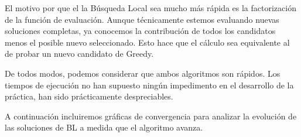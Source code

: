 \documentclass{article}
\begin{document}
   El motivo por que el la Búsqueda Local sea mucho más rápida es la factorización de la función de evaluación. Aunque técnicamente
   estemos evaluando nuevas soluciones completas, ya conocemos la contribución de todos los candidatos menos el posible nuevo
   seleccionado. Esto hace que el cálculo sea equivalente al de probar un nuevo candidato de Greedy.
   
   De todos modos, podemos considerar que ambos algoritmos son rápidos. Los tiempos de ejecución no han supuesto ningún impedimento
   en el desarrollo de la práctica, han sido prácticamente despreciables.
   
   A continuación incluiremos gráficas de convergencia para analizar la evolución de las soluciones de BL a medida que el algoritmo
   avanza.
   
\pagebreak
\end{document}
